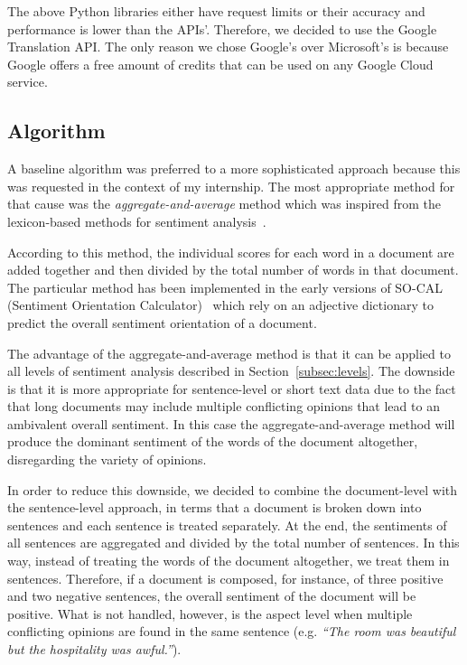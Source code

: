 The above Python libraries either have request limits
or their accuracy and performance is lower than the APIs'.
Therefore, we decided to use the Google Translation API.
The only reason we chose Google's over Microsoft's is
because Google offers a free amount of credits
that can be used on any Google Cloud service.

\subsection{Algorithm}
\label{subsec:algorithm}

A baseline algorithm was preferred to a more sophisticated approach
because this was requested in the context of my internship.
The most appropriate method for that cause was the \emph{aggregate-and-average} method
which was inspired from the lexicon-based methods for sentiment analysis~\cite{TBTV11}.

According to this method,
the individual scores for each word in a document are added together
and then divided by the total number of words in that document.
The particular method has been implemented
in the early versions of SO-CAL (Sentiment Orientation Calculator)~\cite{TG04,TAV06} which rely on an adjective dictionary
to predict the overall sentiment orientation of a document.

The advantage of the aggregate-and-average method is
that it can be applied to all levels of sentiment analysis
described in Section~\ref{subsec:levels}.
The downside is that it is more appropriate for sentence-level or short text data
due to the fact that long documents may include multiple conflicting opinions
that lead to an ambivalent overall sentiment.
In this case the aggregate-and-average method will produce the dominant
sentiment of the words of the document altogether,
disregarding the variety of opinions.

In order to reduce this downside,
we decided to combine the document-level with the sentence-level approach,
in terms that a document is broken down into sentences
and each sentence is treated separately.
At the end, the sentiments of all sentences are aggregated
and divided by the total number of sentences.
In this way,
instead of treating the words of the document altogether,
we treat them in sentences.
Therefore,
if a document is composed, for instance, of three positive and two negative sentences,
the overall sentiment of the document will be positive.
What is not handled, however,
is the aspect level
when multiple conflicting opinions are found in the same sentence
(e.g. \emph{``The room was beautiful but the hospitality was awful.''}).

